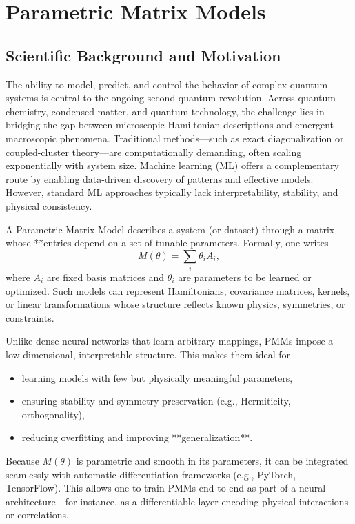 \documentclass[twocolumn,superscriptaddress,unsortedaddress,nofootinbib,amsmath,amssymb,
aps,floatfix]{revtex4-2}
\begin{document}
\section{Parametric Matrix Models}

\subsection{Scientific Background and Motivation}

The ability to model, predict, and control the behavior of complex
quantum systems is central to the ongoing second quantum
revolution. Across quantum chemistry, condensed matter, and quantum
technology, the challenge lies in bridging the gap between microscopic
Hamiltonian descriptions and emergent macroscopic
phenomena. Traditional methods—such as exact diagonalization or
coupled-cluster theory—are computationally demanding, often scaling
exponentially with system size. Machine learning (ML) offers a
complementary route by enabling data-driven discovery of patterns and
effective models. However, standard ML approaches typically lack
interpretability, stability, and physical consistency.


A Parametric Matrix Model describes a system (or dataset) through a
matrix whose **entries depend on a set of tunable
parameters. Formally, one writes
\[
M(\theta) = \sum_i \theta_i A_i,
\]
where $A_i$ are fixed basis matrices and $\theta_i$ are parameters to
be learned or optimized.  Such models can represent Hamiltonians,
covariance matrices, kernels, or linear transformations whose
structure reflects known physics, symmetries, or constraints.

Unlike dense neural networks that learn arbitrary mappings, PMMs
impose a low-dimensional, interpretable structure. This makes them
ideal for
\begin{itemize}
\item learning models with few but physically meaningful parameters,
\item ensuring stability and symmetry preservation (e.g., Hermiticity, orthogonality),
\item reducing overfitting and improving **generalization**.
\end{itemize}


Because $M(\theta)$ is parametric and smooth in its parameters, it can
be integrated seamlessly with automatic differentiation frameworks
(e.g., PyTorch, TensorFlow). This allows one to train PMMs end-to-end
as part of a neural architecture—for instance, as a differentiable
layer encoding physical interactions or correlations.
\end{document}

